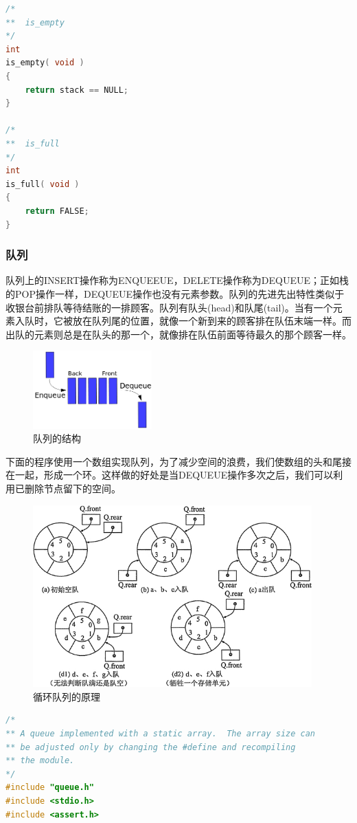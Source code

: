 \documentclass[a4paper]{article}
\begin{document}
\begin{CJK}{UTF8}{gbsn}
\begin{lstlisting}[language=C]
/*
**	is_empty
*/
int
is_empty( void )
{
	return stack == NULL;
}

/*
**	is_full
*/
int
is_full( void )
{
	return FALSE;
}
\end{lstlisting}


\subsubsection*{队列}
队列上的INSERT操作称为ENQUEEUE，DELETE操作称为DEQUEUE；正如栈的POP操作一样，DEQUEUE操作也没有元素参数。队列的先进先出特性类似于收银台前排队等待结账的一排顾客。队列有队头(head)和队尾(tail)。当有一个元素入队时，它被放在队列尾的位置，就像一个新到来的顾客排在队伍末端一样。而出队的元素则总是在队头的那一个，就像排在队伍前面等待最久的那个顾客一样。

\begin{figure}[htbp]
\centering\includegraphics[height=3cm]{queue1.png}
\caption{队列的结构}
\end{figure}

下面的程序使用一个数组实现队列，为了减少空间的浪费，我们使数组的头和尾接在一起，形成一个环。这样做的好处是当DEQUEUE操作多次之后，我们可以利用已删除节点留下的空间。

\begin{figure}[htbp]
\centering\includegraphics[height=7cm]{circlequeue.jpg}
\caption{循环队列的原理}
\end{figure}
\newpage

\begin{lstlisting}[language=C++]
/*
** A queue implemented with a static array.  The array size can
** be adjusted only by changing the #define and recompiling
** the module.
*/
#include "queue.h"
#include <stdio.h>
#include <assert.h>


\end{lstlisting}
\end{CJK}
\end{document}
